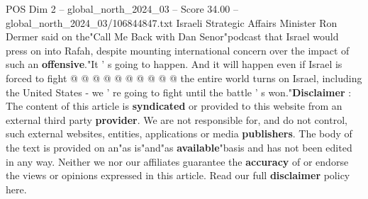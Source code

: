 \begin{textsample}{POS Dim 2 – global\_north\_2024\_03 – Score 34.00 – global\_north\_2024\_03/106844847.txt}
Israeli Strategic Affairs Minister Ron Dermer said on the"Call Me Back with Dan Senor"podcast that Israel would press on into Rafah, despite mounting international concern over the impact of such an \textbf{offensive}."It ' s going to happen.
And it will happen even if Israel is forced to fight @ @ @ @ @ @ @ @ @ @ the entire world turns on Israel, including the United States - we ' re going to fight until the battle ' s won."\textbf{Disclaimer} : The content of this article is \textbf{syndicated} or provided to this website from an external third party \textbf{provider}.
We are not responsible for, and do not control, such external websites, entities, applications or media \textbf{publishers}.
The body of the text is provided on an"as is"and"as \textbf{available}"basis and has not been edited in any way.
Neither we nor our affiliates guarantee the \textbf{accuracy} of or endorse the views or opinions expressed in this article.
Read our full \textbf{disclaimer} policy here.

\end{textsample}
